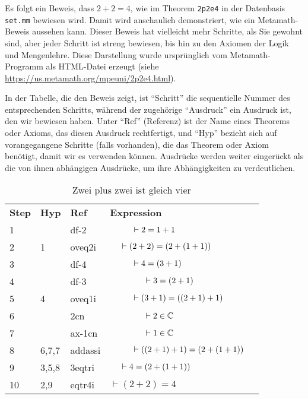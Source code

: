 Es folgt ein Beweis, dass $2 + 2 = 4$, wie im Theorem \texttt{2p2e4} in der Datenbasis \texttt{set.mm} bewiesen wird. Damit wird anschaulich demonstriert, wie ein Metamath-Beweis aussehen kann. Dieser Beweis hat vielleicht mehr Schritte, als Sie gewohnt sind, aber jeder Schritt ist streng bewiesen, bis hin zu den Axiomen der Logik und Mengenlehre. Diese Darstellung wurde ursprünglich vom Metamath-Programm als {\sc HTML}-Datei erzeugt (siehe \url{https://us.metamath.org/mpeuni/2p2e4.html}).

In der Tabelle, die den Beweis zeigt, ist "`Schritt"' die sequentielle Nummer des entsprechenden Schritts, während der zugehörige "`Ausdruck"' ein Ausdruck ist, den wir bewiesen haben. Unter "`Ref"' (Referenz) ist der Name eines Theorems oder Axioms, das diesen Ausdruck rechtfertigt, und "`Hyp"' bezieht sich auf vorangegangene Schritte (falls vorhanden), die das Theorem oder Axiom benötigt, damit wir es verwenden können.  Ausdrücke werden weiter eingerückt als die von ihnen abhängigen Ausdrücke, um ihre Abhängigkeiten zu verdeutlichen.

\begin{table}[!htbp]
\caption{Zwei plus zwei ist gleich vier}
\begin{tabular}{lllll}
\textbf{Step} & \textbf{Hyp} & \textbf{Ref} & \textbf{Expression} & \\
1  &       & df-2    & $ \hspace*{10mm} \vdash 2 = 1 + 1$  & \\
2  & 1     & oveq2i  & $ \hspace*{5mm} \vdash (2 + 2) = (2 + (1 + 1))$ & \\
3  &       & df-4    & $ \hspace*{10mm} \vdash 4 = (3 + 1)$ & \\
4  &       & df-3    & $ \hspace*{15mm} \vdash 3 = (2 + 1)$ & \\
5  & 4     & oveq1i  & $ \hspace*{10mm} \vdash (3 + 1) = ((2 + 1) + 1)$ & \\
6  &       & 2cn     & $ \hspace*{15mm} \vdash 2 \in \mathbb{C}$ & \\
7  &       & ax-1cn  & $ \hspace*{15mm} \vdash 1 \in \mathbb{C}$ & \\
8  & 6,7,7 & addassi & $ \hspace*{10mm} \vdash ((2 + 1) + 1) = (2 + (1 + 1))$ & \\
9  & 3,5,8 & 3eqtri  & $ \hspace*{5mm} \vdash 4 = (2 + (1 + 1))$ & \\
10 & 2,9   & eqtr4i  & $ \vdash (2 + 2) = 4$ & \\
\end{tabular}
\end{table}

